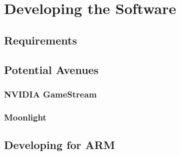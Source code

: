 \chapter{Developing the Software} %

\label{Chapter5} %


\section{Requirements}

\todosection


\section{Potential Avenues}

\todosection


\subsection{NVIDIA GameStream}

\todosection


\subsection{Moonlight}

\todosection


\section{Developing for ARM}

\todosection